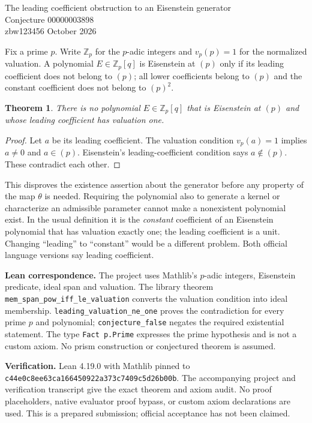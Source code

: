 \documentclass[11pt]{article}
\newtheorem{theorem}{Theorem}
\begin{document}
\begin{center}{\Large The leading coefficient obstruction to an Eisenstein generator}\\[5pt]{\large Conjecture 00000003898}\\[5pt]zbw123456  October 2026\end{center}

Fix a prime $p$. Write $\mathbb Z_p$ for the $p$-adic integers and $v_p(p)=1$ for the normalized valuation. A polynomial $E\in\mathbb Z_p[q]$ is Eisenstein at $(p)$ only if its leading coefficient does not belong to $(p)$; all lower coefficients belong to $(p)$ and the constant coefficient does not belong to $(p)^2$.
\begin{theorem}
There is no polynomial $E\in\mathbb Z_p[q]$ that is Eisenstein at $(p)$ and whose leading coefficient has valuation one.
\end{theorem}
\begin{proof}
Let $a$ be its leading coefficient. The valuation condition $v_p(a)=1$ implies $a\ne0$ and $a\in(p)$. Eisenstein's leading-coefficient condition says $a\notin(p)$. These contradict each other.
\end{proof}
This disproves the existence assertion about the generator before any property of the map $\theta$ is needed. Requiring the polynomial also to generate a kernel or characterize an admissible parameter cannot make a nonexistent polynomial exist. In the usual definition it is the \emph{constant} coefficient of an Eisenstein polynomial that has valuation exactly one; the leading coefficient is a unit. Changing ``leading'' to ``constant'' would be a different problem. Both official language versions say leading coefficient.

\textbf{Lean correspondence.} The project uses Mathlib's $p$-adic integers, Eisenstein predicate, ideal span and valuation. The library theorem \texttt{mem\_span\_pow\_iff\_le\_valuation} converts the valuation condition into ideal membership. \texttt{leading\_valuation\_ne\_one} proves the contradiction for every prime $p$ and polynomial; \texttt{conjecture\_false} negates the required existential statement. The type \texttt{Fact p.Prime} expresses the prime hypothesis and is not a custom axiom. No prism construction or conjectured theorem is assumed.


\textbf{Verification.} Lean 4.19.0 with Mathlib pinned to
\texttt{c44e0c8ee63ca166450922a373c7409c5d26b00b}.
The accompanying project and verification transcript give the exact theorem and axiom audit. No proof placeholders, native evaluator proof bypass, or custom axiom declarations are used. This is a prepared submission; official acceptance has not been claimed.
\end{document}
